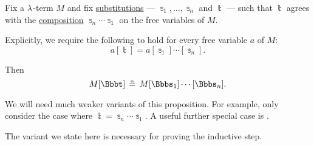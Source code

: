 \begin{proposition}\label{thm:nary_substitution_composition_match_is_alpha_equivalent}
  Fix a \( {\mathrm \lambda} \)-term \( M \) and fix \hyperref[def:lambda_term_substitution]{substitutions} --- \( \Bbbs_1, \ldots, \Bbbs_n \) and \( \Bbbt \) --- such that \( \Bbbt \) agrees with the \hyperref[def:lambda_substitution_composition]{composition} \( \Bbbs_n \cdots \Bbbs_1 \) on the free variables of \( M \).

  Explicitly, we require the following to hold for every free variable \( a \) of \( M \):
  \begin{equation*}
    a[\Bbbt] = a[\Bbbs_1] \cdots [\Bbbs_n].
  \end{equation*}

  Then
  \begin{equation}\label{eq:thm:nary_substitution_composition_match_is_alpha_equivalent}
    M[\Bbbt] \aequiv M[\Bbbs_1] \cdots [\Bbbs_n].
  \end{equation}
\end{proposition}
\begin{comments}
  \item We will need much weaker variants of this proposition. For example,  only consider the case where \( \Bbbt = \Bbbs_n \cdots \Bbbs_1 \). A useful further special case is .

  The variant we state here is necessary for proving the inductive step.
\end{comments}
